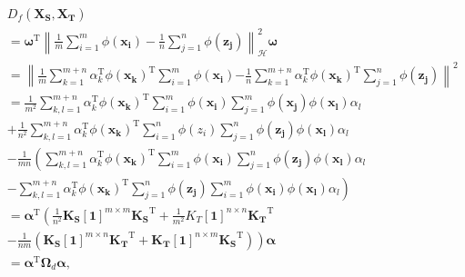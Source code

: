 \documentclass[a4paper]{cas-sc}
\begin{document}
\begin{equation}\label{Df}
\begin{aligned}
&D_{f}\left(\boldsymbol{X_S}, \boldsymbol{X_T}\right) \\
&=  \boldsymbol{\omega}^{\mathrm{T}}\left\|\frac{1}{m} \sum_{i=1}^{m} \phi\left(\boldsymbol{x_i}\right)-\frac{1}{n} \sum_{j=1}^{n} \phi\left(\boldsymbol{z_j}\right)\right\|_{\mathcal{H}}^{2} \boldsymbol{\omega} \\
&=  \left\|\frac{1}{m} \sum_{k=1}^{m+n} \alpha_{k}^{\mathrm{T}} \phi\left(\boldsymbol{x_k}\right)^{\mathrm{T}} \sum_{i=1}^{m} \phi\left(\boldsymbol{x_i}\right)\right. \left.-\frac{1}{n} 
\sum_{k=1}^{m+n} \alpha_{k}^{\mathrm{T}} \phi\left(\boldsymbol{x_k}\right)^{\mathrm{T}} \sum_{j=1}^{n} \phi\left(\boldsymbol{z_j}\right)\right\|^{2} \\
&=  \frac{1}{m^{2}} \sum_{k, l=1}^{m+n} \alpha_{k}^{\mathrm{T}} \phi\left(\boldsymbol{x_k}\right)^{\mathrm{T}} \sum_{i=1}^{m} \phi\left(\boldsymbol{x_i}\right) \sum_{j=1}^{m} \phi\left(\boldsymbol{x_j}\right) \phi\left(\boldsymbol{x_l}\right) \alpha_{l} \\
 &+\frac{1}{n^{2}} \sum_{k, l=1}^{m+n} \alpha_{k}^{\mathrm{T}} \phi\left(\boldsymbol{x_k}\right)^{\mathrm{T}} \sum_{i=1}^{n} \phi\left(z_{i}\right) \sum_{j=1}^{n} \phi\left(\boldsymbol{z_j}\right) \phi\left(\boldsymbol{x_l}\right) \alpha_{l}\\
& -\frac{1}{m n}\left(\sum_{k, l=1}^{m+n} \alpha_{k}^{\mathrm{T}} \phi\left(\boldsymbol{x_k}\right)^{\mathrm{T}} \sum_{i=1}^{m} \phi\left(\boldsymbol{x_i}\right) \sum_{j=1}^{n} \phi\left(\boldsymbol{z_j}\right) \phi\left(\boldsymbol{x_l}\right) \alpha_{l}\right. \\
& \left.-\sum_{k, l=1}^{m+n} \alpha_{k}^{\mathrm{T}} \phi\left(\boldsymbol{x_k}\right)^{\mathrm{T}} \sum_{j=1}^{n} \phi\left(\boldsymbol{z_j}\right) \sum_{i=1}^{m} \phi\left(\boldsymbol{x_i}\right) \phi\left(\boldsymbol{x_l}\right) \alpha_{l}\right) \\
&=  \boldsymbol{\alpha}^{\mathrm{T}}\left(\frac{1}{n^{2}} \boldsymbol{K_{{S}}}\boldsymbol{[1]}^{m \times m} \boldsymbol{K_{S}}^{\mathrm{T}}+\frac{1}{m^{2}} K_{{T}}\boldsymbol{[1]}^{n \times n} \boldsymbol{K_{T}}^{\mathrm{T}}\right. \\
& \left.-\frac{1}{n m}\left(\boldsymbol{K_{{S}}}\boldsymbol{[1]}^{m \times n} \boldsymbol{K_{{T}}}^{\mathrm{T}}+\boldsymbol{K_{{T}}}\boldsymbol{[1]}^{n \times m} \boldsymbol{K_{{S}}}^{\mathrm{T}}\right)\right) \boldsymbol{\alpha} \\
&=  \boldsymbol{\alpha}^{\mathrm{T}} \boldsymbol{\Omega}_{d} \boldsymbol{\alpha},
\end{aligned}
\end{equation}
\end{document}
